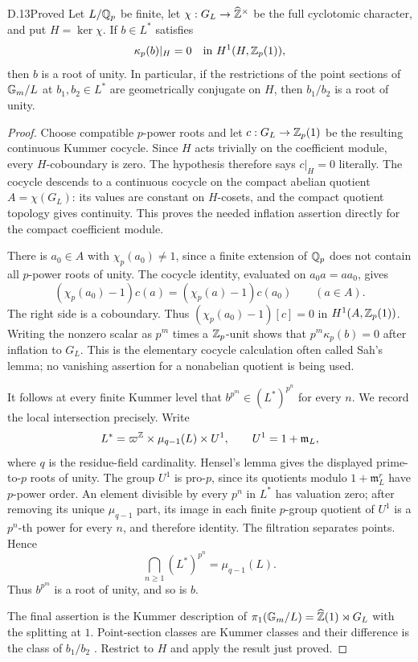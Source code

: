 \begin{claim}{D.13}{Proved}
Let $L/\mathbb Q_p$ be finite, let
$\chi:G_L\to\widehat{\mathbb Z}^\times$ be the full cyclotomic
character, and put $H=\ker\chi$. If $b\in L^*$ satisfies
\[
            \kappa_p(b)|_H=0
                    \quad\hbox{in }H^1(H,\mathbb Z_p(1)),
\]
then $b$ is a root of unity. In particular, if the restrictions
of the point sections of $\mathbb G_m/L$ at $b_1,b_2\in L^*$
are geometrically conjugate on $H$, then $b_1/b_2$ is a
root of unity.
\end{claim}
\begin{proof}
Choose compatible $p$-power roots and let
$c:G_L\to\mathbb Z_p(1)$ be the resulting continuous Kummer
cocycle. Since $H$ acts trivially on the coefficient module,
every $H$-coboundary is zero. The hypothesis therefore says
$c|_H=0$ literally. The cocycle descends to a continuous
cocycle on the compact abelian quotient
$A=\chi(G_L)$: its values are constant on $H$-cosets,
and the compact quotient topology gives continuity. This
proves the needed inflation assertion directly for the
compact coefficient module.

There is $a_0\in A$ with $\chi_p(a_0)\ne1$, since a finite
extension of $\mathbb Q_p$ does not contain all $p$-power roots
of unity. The cocycle identity, evaluated on $a_0a=aa_0$,
gives
\[
 (\chi_p(a_0)-1)c(a)=(\chi_p(a)-1)c(a_0)
                                         \qquad(a\in A).
\]
The right side is a coboundary. Thus
$(\chi_p(a_0)-1)[c]=0$ in $H^1(A,\mathbb Z_p(1))$.
Writing the nonzero scalar as $p^m$ times a $\mathbb Z_p$-unit
shows that $p^m\kappa_p(b)=0$ after inflation to $G_L$.
This is the elementary cocycle calculation often called
Sah's lemma; no vanishing assertion for a nonabelian
quotient is being used.

It follows at every finite Kummer level that
$b^{p^m}\in (L^*)^{p^n}$ for every $n$. We record the local
intersection precisely. Write
\[
 L^*=\varpi^{\mathbb Z}\times\mu_{q-1}(L)\times U^1,
               \qquad U^1=1+\mathfrak m_L,
\]
where $q$ is the residue-field cardinality. Hensel's lemma
gives the displayed prime-to-$p$ roots of unity. The group
$U^1$ is pro-$p$, since its quotients modulo
$1+\mathfrak m_L^r$ have $p$-power order. An element
divisible by every $p^n$ in $L^*$ has valuation zero;
after removing its unique $\mu_{q-1}$ part, its image in
each finite $p$-group quotient of $U^1$ is a $p^n$-th
power for every $n$, and therefore identity. The filtration
separates points. Hence
\[
                    \bigcap_{n\geq1}(L^*)^{p^n}
                             =\mu_{q-1}(L).
\]
Thus $b^{p^m}$ is a root of unity, and so is $b$.

The final assertion is the Kummer description of
$\pi_1(\mathbb G_m/L)=\widehat{\mathbb Z}(1)\rtimes G_L$ with the
splitting at $1$. Point-section classes are Kummer classes
and their difference is the class of $b_1/b_2$
\citep[\S2.2 and \S8.1--8.3, especially Proposition~26]{F_Stix2008}.
Restrict to $H$ and apply the result just proved.
\end{proof}

